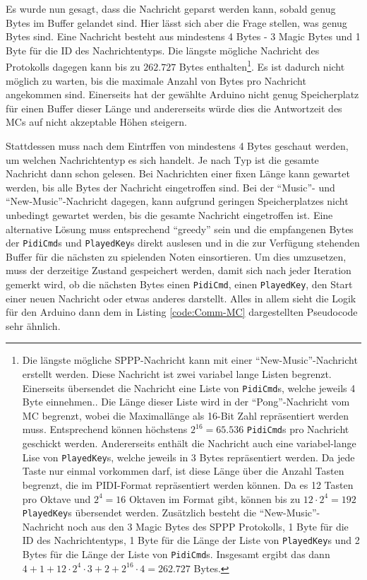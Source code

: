 Es wurde nun gesagt, dass die Nachricht geparst werden kann, sobald genug Bytes im Buffer gelandet sind.
Hier lässt sich aber die Frage stellen, was genug Bytes sind.
Eine Nachricht besteht aus mindestens 4 Bytes - 3 Magic Bytes und 1 Byte für die ID des Nachrichtentyps.
Die längste mögliche Nachricht des Protokolls dagegen kann bis zu $262.727$ Bytes enthalten\footnote{Die längste mögliche \ac{SPPP}-Nachricht kann mit einer \enquote{New-Music}-Nachricht erstellt werden. Diese Nachricht ist zwei variabel lange Listen begrenzt. Einerseits übersendet die Nachricht eine Liste von \lstinline|PidiCmd|s, welche jeweils 4 Byte einnehmen.. Die Länge dieser Liste wird in der \enquote{Pong}-Nachricht vom \ac{MC} begrenzt, wobei die Maximallänge als 16-Bit Zahl repräsentiert werden muss. Entsprechend können höchstens $2^{16} = 65.536$ \lstinline|PidiCmd|s pro Nachricht geschickt werden. Andererseits enthält die Nachricht auch eine variabel-lange Lise von \lstinline|PlayedKey|s, welche jeweils in 3 Bytes repräsentiert werden. Da jede Taste nur einmal vorkommen darf, ist diese Länge über die Anzahl Tasten begrenzt, die im \ac{PIDI}-Format repräsentiert werden können. Da es 12 Tasten pro Oktave und $2^4=16$ Oktaven im Format gibt, können bis zu $12 \cdot 2^4 = 192$ \lstinline|PlayedKey|s übersendet werden. Zusätzlich besteht die \enquote{New-Music}-Nachricht noch aus den 3 Magic Bytes des \ac{SPPP} Protokolls, 1 Byte für die ID des Nachrichtentyps, 1 Byte für die Länge der Liste von \lstinline|PlayedKey|s und 2 Bytes für die Länge der Liste von \lstinline|PidiCmd|s. Insgesamt ergibt das dann $4 + 1 + 12 \cdot 2^4 \cdot 3 + 2 + 2^{16} \cdot 4 = 262.727$ Bytes.}.
Es ist dadurch nicht möglich zu warten, bis die maximale Anzahl von Bytes pro Nachricht angekommen sind.
Einerseits hat der gewählte Arduino nicht genug Speicherplatz für einen Buffer dieser Länge und andererseits würde dies die Antwortzeit des \ac{MC}s auf nicht akzeptable Höhen steigern.

Stattdessen muss nach dem Eintrffen von mindestens 4 Bytes geschaut werden, um welchen Nachrichtentyp es sich handelt.
Je nach Typ ist die gesamte Nachricht dann schon gelesen.
Bei Nachrichten einer fixen Länge kann gewartet werden, bis alle Bytes der Nachricht eingetroffen sind.
Bei der \enquote{Music}- und \enquote{New-Music}-Nachricht dagegen, kann aufgrund geringen Speicherplatzes nicht unbedingt gewartet werden, bis die gesamte Nachricht eingetroffen ist.
Eine alternative Lösung muss entsprechend \enquote{greedy} sein und die empfangenen Bytes der \lstinline|PidiCmd|s und \lstinline|PlayedKey|s direkt auslesen und in die zur Verfügung stehenden Buffer für die nächsten zu spielenden Noten einsortieren.
Um dies umzusetzen, muss der derzeitige Zustand gespeichert werden, damit sich nach jeder Iteration gemerkt wird, ob die nächsten Bytes einen \lstinline|PidiCmd|, einen \lstinline|PlayedKey|, den Start einer neuen Nachricht oder etwas anderes darstellt.
Alles in allem sieht die Logik für den Arduino dann dem in Listing \ref{code:Comm-MC} dargestellten Pseudocode sehr ähnlich.

